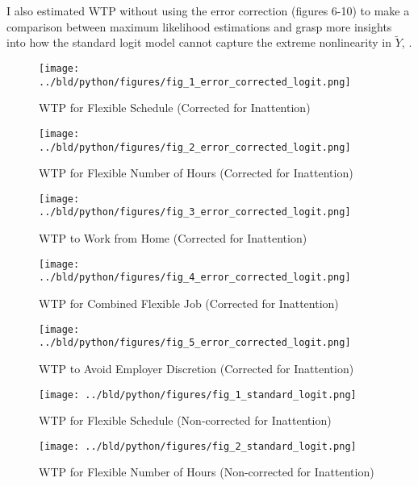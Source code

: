 \documentclass[11pt]{article}
\begin{document}
I also estimated WTP without using the error correction (figures 6-10) to make a comparison between maximum likelihood estimations and grasp more insights into how the standard logit model cannot capture the extreme nonlinearity in $\tilde{Y}$, \cite{10.1257/aer.20161500}.

\begin{figure}[h!]
    \centering
    \texttt{[image: ../bld/python/figures/fig\_1\_error\_corrected\_logit.png]}
    \caption{WTP for Flexible Schedule (Corrected for Inattention)}
    \label{fig:logistic_regression_1}
    \end{figure}

\begin{figure}[h!]
    \centering
    \texttt{[image: ../bld/python/figures/fig\_2\_error\_corrected\_logit.png]}
    \caption{WTP for Flexible Number of Hours (Corrected for Inattention)}
    \label{fig:logistic_regression_2}
    \end{figure}

\begin{figure}[h!]
    \centering
    \texttt{[image: ../bld/python/figures/fig\_3\_error\_corrected\_logit.png]}
    \caption{WTP to Work from Home (Corrected for Inattention)}
    \label{fig:logistic_regression_3}
    \end{figure}

\begin{figure}[h!]
    \centering
    \texttt{[image: ../bld/python/figures/fig\_4\_error\_corrected\_logit.png]}
    \caption{WTP for Combined Flexible Job (Corrected for Inattention)}
    \label{fig:logistic_regression_4}
    \end{figure}

\begin{figure}[h!]
    \centering
    \texttt{[image: ../bld/python/figures/fig\_5\_error\_corrected\_logit.png]}
    \caption{WTP to Avoid Employer Discretion (Corrected for Inattention)}
    \label{fig:logistic_regression_5}
    \end{figure}

\begin{figure}[h!]
    \centering
    \texttt{[image: ../bld/python/figures/fig\_1\_standard\_logit.png]}
    \caption{WTP for Flexible Schedule (Non-corrected for Inattention)}
    \label{fig:logistic_regression_6}
    \end{figure}

\begin{figure}[h!]
    \centering
    \texttt{[image: ../bld/python/figures/fig\_2\_standard\_logit.png]}
    \caption{WTP for Flexible Number of Hours (Non-corrected for Inattention)}
    \label{fig:logistic_regression_7}
    \end{figure}
\end{document}
